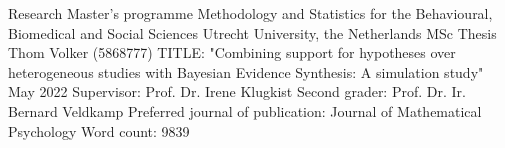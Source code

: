 \documentclass[review, 3p, authoryear]{elsarticle} %
\begin{document}
\thispagestyle{empty}

\begin{large}
\noindent Research Master's programme 
Methodology and Statistics for the Behavioural, Biomedical and Social Sciences \newline
Utrecht University, the Netherlands \newline
\newline
\newline
\newline
\newline
MSc Thesis Thom Volker (5868777) 
\newline
TITLE: "Combining support for hypotheses over heterogeneous studies with Bayesian Evidence Synthesis: A simulation study" 
\newline
May 2022 
\newline
\newline
\newline
\newline
\newline
Supervisor:\newline
Prof. Dr. Irene Klugkist \newline
\newline
\newline
Second grader: \newline
Prof. Dr. Ir. Bernard Veldkamp
\newline
\newline
\newline
\newline
Preferred journal of publication: Journal of Mathematical Psychology 
\newline
Word count: 9839
\newline
\end{large}
\addtocounter{page}{-1}
\clearpage
\pagebreak
\end{document}
